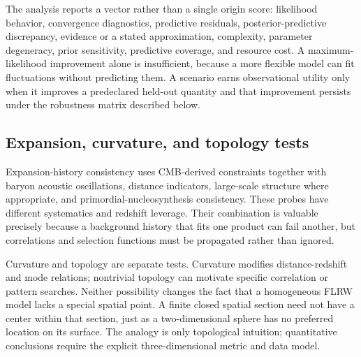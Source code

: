 \documentclass[10pt,conference]{IEEEtran}
\begin{document}
The analysis reports a vector rather than a single origin score: likelihood behavior, convergence diagnostics, predictive residuals, posterior-predictive discrepancy, evidence or a stated approximation, complexity, parameter degeneracy, prior sensitivity, predictive coverage, and resource cost. A maximum-likelihood improvement alone is insufficient, because a more flexible model can fit fluctuations without predicting them. A scenario earns observational utility only when it improves a predeclared held-out quantity and that improvement persists under the robustness matrix described below.

\subsection{Expansion, curvature, and topology tests}

Expansion-history consistency uses CMB-derived constraints together with baryon acoustic oscillations, distance indicators, large-scale structure where appropriate, and primordial-nucleosynthesis consistency. These probes have different systematics and redshift leverage. Their combination is valuable precisely because a background history that fits one product can fail another, but correlations and selection functions must be propagated rather than ignored.

Curvature and topology are separate tests. Curvature modifies distance-redshift and mode relations; nontrivial topology can motivate specific correlation or pattern searches. Neither possibility changes the fact that a homogeneous FLRW model lacks a special spatial point. A finite closed spatial section need not have a center within that section, just as a two-dimensional sphere has no preferred location on its surface. The analogy is only topological intuition; quantitative conclusions require the explicit three-dimensional metric and data model.
\end{document}

